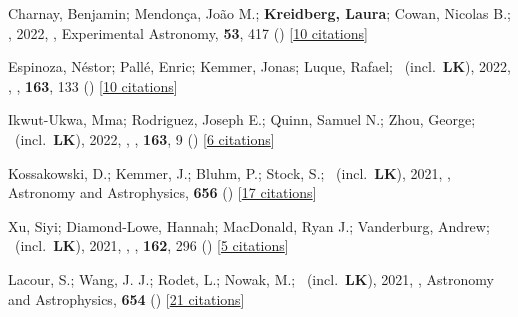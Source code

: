 \item[{\color{numcolor}\scriptsize64}] Charnay, Benjamin; Mendon{\c{c}}a, Jo{\~a}o M.; \textbf{Kreidberg, Laura}; Cowan, Nicolas B.; \etal, 2022, , Experimental Astronomy, \textbf{53}, 417 () [\href{https://ui.adsabs.harvard.edu/abs/2022ExA....53..417C}{10 citations}]

\item[{\color{numcolor}\scriptsize63}] Espinoza, N{\'e}stor; Pall{\'e}, Enric; Kemmer, Jonas; Luque, Rafael; \etal\ (incl.\ \textbf{LK}), 2022, , \aj, \textbf{163}, 133 () [\href{https://ui.adsabs.harvard.edu/abs/2022AJ....163..133E}{10 citations}]

\item[{\color{numcolor}\scriptsize62}] Ikwut-Ukwa, Mma; Rodriguez, Joseph E.; Quinn, Samuel N.; Zhou, George; \etal\ (incl.\ \textbf{LK}), 2022, , \aj, \textbf{163}, 9 () [\href{https://ui.adsabs.harvard.edu/abs/2022AJ....163....9I}{6 citations}]

\item[{\color{numcolor}\scriptsize61}] Kossakowski, D.; Kemmer, J.; Bluhm, P.; Stock, S.; \etal\ (incl.\ \textbf{LK}), 2021, , Astronomy and Astrophysics, \textbf{656} () [\href{https://ui.adsabs.harvard.edu/abs/2021A&A...656A.124K}{17 citations}]

\item[{\color{numcolor}\scriptsize60}] Xu, Siyi; Diamond-Lowe, Hannah; MacDonald, Ryan J.; Vanderburg, Andrew; \etal\ (incl.\ \textbf{LK}), 2021, , \aj, \textbf{162}, 296 () [\href{https://ui.adsabs.harvard.edu/abs/2021AJ....162..296X}{5 citations}]

\item[{\color{numcolor}\scriptsize59}] Lacour, S.; Wang, J. J.; Rodet, L.; Nowak, M.; \etal\ (incl.\ \textbf{LK}), 2021, , Astronomy and Astrophysics, \textbf{654} () [\href{https://ui.adsabs.harvard.edu/abs/2021A&A...654L...2L}{21 citations}]


